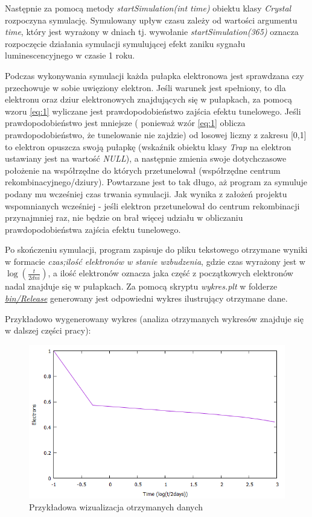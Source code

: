 Następnie za pomocą metody \textit{startSimulation(int time)} obiektu klasy \textit{Crystal} rozpoczyna symulację. Symulowany upływ czasu  zależy od wartości argumentu \textit{time}, który jest wyrażony w dniach tj. wywołanie \emph{startSimulation(365)} oznacza rozpoczęcie działania symulacji symulującej efekt zaniku sygnału luminescencyjnego w czasie 1 roku.

Podczas wykonywania symulacji każda pułapka elektronowa jest sprawdzana czy przechowuje w sobie uwięziony elektron. Jeśli warunek jest spełniony, to dla elektronu oraz dziur elektronowych znajdujących się w pułapkach, za pomocą wzoru \ref{eq:1} wyliczane jest prawdopodobieństwo zajścia efektu tunelowego. Jeśli prawdopodobieństwo jest mniejsze ( ponieważ wzór \ref{eq:1} oblicza prawdopodobieństwo, że tunelowanie nie zajdzie) od losowej liczny z zakresu [0,1] to elektron opuszcza swoją pułapkę (wskaźnik obiektu klasy \textit{Trap} na elektron ustawiany jest na wartość \textit{NULL}), a następnie zmienia swoje dotychczasowe położenie na współrzędne do których przetunelował (współrzędne centrum rekombinacyjnego/dziury). Powtarzane jest to tak długo, aż program za symuluje podany mu wcześniej czas trwania symulacji.  Jak wynika z założeń projektu wspomnianych wcześniej - jeśli elektron przetunelował do centrum rekombinacji przynajmniej raz, nie będzie on brał więcej udziału w obliczaniu prawdopodobieństwa zajścia efektu tunelowego. 

Po skończeniu symulacji, program zapisuje do pliku tekstowego otrzymane wyniki w formacie \textit{czas;ilość elektronów w stanie wzbudzenia}, gdzie czas wyrażony jest w $ \log(\frac{t}{2 dni}) $, a ilość elektronów oznacza jaka część z początkowych elektronów nadal znajduje się w pułapkach. Za pomocą skryptu \textit{wykres.plt}
w folderze \href{https://github.com/Sharkuu/Dissertation/tree/master/bin/Release}{\textit{bin/Release}} generowany jest odpowiedni wykres ilustrujący otrzymane dane. 

Przykładowo wygenerowany wykres (analiza otrzymanych wykresów znajduje się w dalszej części pracy):

\begin{figure}[H]
\centering
\includegraphics[width=15cm]{example}
\caption{Przykładowa wizualizacja otrzymanych danych}
\label{fig:example}
\end{figure}


